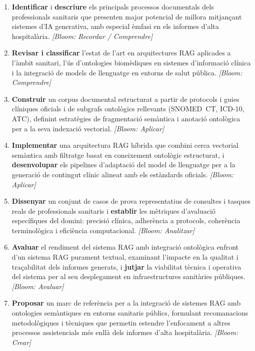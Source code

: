 \documentclass[CAT]{TFUOC}%
\begin{document}
\begin{enumerate}

    \item \textbf{Identificar} i \textbf{descriure} els principals processos documentals dels professionals sanitaris que presenten major potencial de millora mitjançant sistemes d'IA generativa, amb especial èmfasi en els informes d'alta hospitalària.
    \textit{[Bloom: Recordar / Comprendre]}

    \item \textbf{Revisar i classificar} l'estat de l'art en arquitectures RAG aplicades a l'àmbit sanitari, l'ús d'ontologies biomèdiques en sistemes d'informació clínica i la integració de models de llenguatge en entorns de salut pública.
    \textit{[Bloom: Comprendre]}

    \item \textbf{Construir} un corpus documental estructurat a partir de protocols i guies clíniques oficials i de subgrafs ontològics rellevants (SNOMED~CT, ICD-10, ATC), definint estratègies de fragmentació semàntica i anotació ontològica per a la seva indexació vectorial.
    \textit{[Bloom: Aplicar]}

    \item \textbf{Implementar} una arquitectura RAG híbrida que combini cerca vectorial semàntica amb filtratge basat en coneixement ontològic estructurat, i \textbf{desenvolupar} els pipelines d'adaptació del model de llenguatge per a la generació de contingut clínic alineat amb els estàndards oficials.
    \textit{[Bloom: Aplicar]}
    
    \item \textbf{Dissenyar} un conjunt de casos de prova representatius de consultes i tasques reals de professionals sanitaris i \textbf{establir} les mètriques d'avaluació específiques del domini: precisió clínica, adherència a protocols, coherència terminològica i eficiència computacional.
    \textit{[Bloom: Analitzar]}

    \item \textbf{Avaluar} el rendiment del sistema RAG amb integració ontològica enfront d'un sistema RAG purament textual, examinant l'impacte en la qualitat i traçabilitat dels informes generats, i \textbf{jutjar} la viabilitat tècnica i operativa del sistema per al seu desplegament en infraestructures sanitàries públiques.
    \textit{[Bloom: Avaluar]}

    \item \textbf{Proposar} un marc de referència per a la integració de sistemes RAG amb ontologies semàntiques en entorns sanitaris públics, formulant recomanacions metodològiques i tècniques que permetin estendre l'enfocament a altres processos assistencials més enllà dels informes d'alta hospitalària.
    \textit{[Bloom: Crear]}
\end{enumerate}
\end{document}
